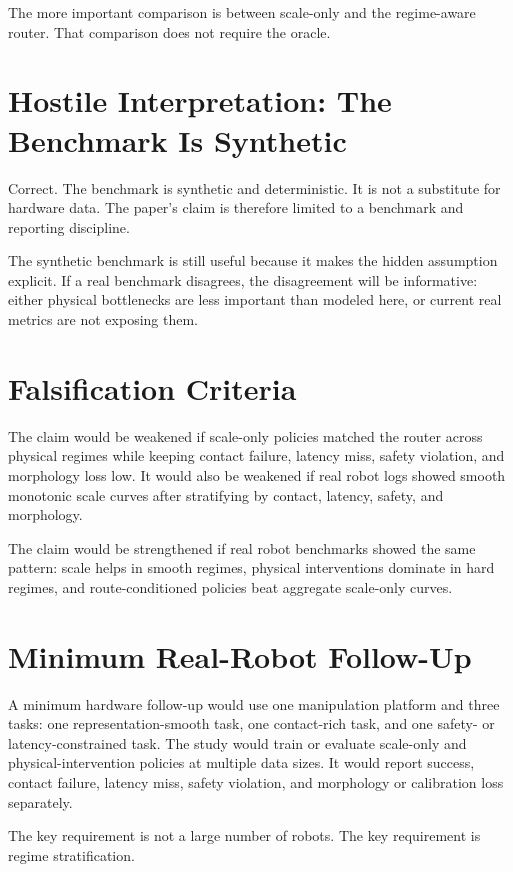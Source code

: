 The more important comparison is between scale-only and the regime-aware router. That comparison does not require the oracle.

\section{Hostile Interpretation: The Benchmark Is Synthetic}

Correct. The benchmark is synthetic and deterministic. It is not a substitute for hardware data. The paper's claim is therefore limited to a benchmark and reporting discipline.

The synthetic benchmark is still useful because it makes the hidden assumption explicit. If a real benchmark disagrees, the disagreement will be informative: either physical bottlenecks are less important than modeled here, or current real metrics are not exposing them.

\section{Falsification Criteria}

The claim would be weakened if scale-only policies matched the router across physical regimes while keeping contact failure, latency miss, safety violation, and morphology loss low. It would also be weakened if real robot logs showed smooth monotonic scale curves after stratifying by contact, latency, safety, and morphology.

The claim would be strengthened if real robot benchmarks showed the same pattern: scale helps in smooth regimes, physical interventions dominate in hard regimes, and route-conditioned policies beat aggregate scale-only curves.

\section{Minimum Real-Robot Follow-Up}

A minimum hardware follow-up would use one manipulation platform and three tasks: one representation-smooth task, one contact-rich task, and one safety- or latency-constrained task. The study would train or evaluate scale-only and physical-intervention policies at multiple data sizes. It would report success, contact failure, latency miss, safety violation, and morphology or calibration loss separately.

The key requirement is not a large number of robots. The key requirement is regime stratification.

